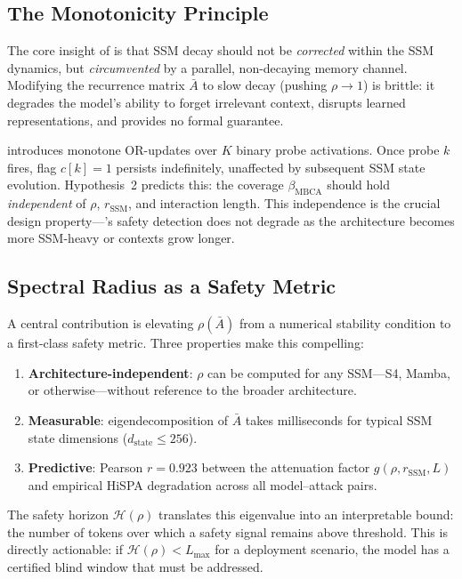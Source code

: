 \documentclass{article}
\newcommand{\rSSM}{r_{\mathrm{SSM}}}
\newcommand{\Horizon}{\mathcal{H}(\rho)}
\newcommand{\MBCA}{\mathrm{MBCA}}
\newcommand{\betaMBCA}{\beta_{\MBCA}}
\begin{document}
\subsection{The Monotonicity Principle}

The core insight of \MBCA{} is that SSM decay should not be \emph{corrected} within the SSM dynamics, but \emph{circumvented} by a parallel, non-decaying memory channel. Modifying the recurrence matrix $\bar{A}$ to slow decay (pushing $\rho \to 1$) is brittle: it degrades the model's ability to forget irrelevant context, disrupts learned representations, and provides no formal guarantee.

\MBCA{} introduces monotone OR-updates over $K$ binary probe activations. Once probe $k$ fires, flag $c[k] = 1$ persists indefinitely, unaffected by subsequent SSM state evolution. Hypothesis~2 predicts this: the \MBCA{} coverage $\betaMBCA$ should hold \emph{independent} of $\rho$, $\rSSM$, and interaction length. This independence is the crucial design property---\MBCA{}'s safety detection does not degrade as the architecture becomes more SSM-heavy or contexts grow longer.

\subsection{Spectral Radius as a Safety Metric}

A central contribution is elevating $\rho(\bar{A})$ from a numerical stability condition to a first-class safety metric. Three properties make this compelling:

\begin{enumerate}[label=(\arabic*)]
  \item \textbf{Architecture-independent}: $\rho$ can be computed for any SSM---S4, Mamba, or otherwise---without reference to the broader architecture.
  \item \textbf{Measurable}: eigendecomposition of $\bar{A}$ takes milliseconds for typical SSM state dimensions ($d_{\mathrm{state}} \leq 256$).
  \item \textbf{Predictive}: Pearson $r = 0.923$ between the attenuation factor $g(\rho, \rSSM, L)$ and empirical HiSPA degradation across all model--attack pairs.
\end{enumerate}

The safety horizon $\Horizon$ translates this eigenvalue into an interpretable bound: the number of tokens over which a safety signal remains above threshold. This is directly actionable: if $\Horizon < L_{\max}$ for a deployment scenario, the model has a certified blind window that must be addressed.
\end{document}
